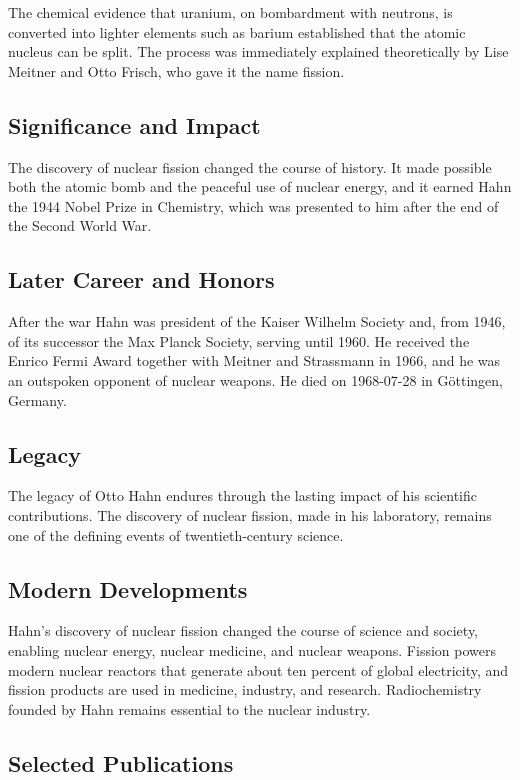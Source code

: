 The chemical evidence that uranium, on bombardment with neutrons, is converted into lighter elements such as barium established that the atomic nucleus can be split.
The process was immediately explained theoretically by Lise Meitner and Otto Frisch, who gave it the name fission.

\subsection*{Significance and Impact}

The discovery of nuclear fission changed the course of history.
It made possible both the atomic bomb and the peaceful use of nuclear energy, and it earned Hahn the 1944 Nobel Prize in Chemistry, which was presented to him after the end of the Second World War.

\subsection*{Later Career and Honors}

After the war Hahn was president of the Kaiser Wilhelm Society and, from 1946, of its successor the Max Planck Society, serving until 1960.
He received the Enrico Fermi Award together with Meitner and Strassmann in 1966, and he was an outspoken opponent of nuclear weapons.
He died on 1968-07-28 in Göttingen, Germany.

\subsection*{Legacy}

The legacy of Otto Hahn endures through the lasting impact of his scientific contributions.
The discovery of nuclear fission, made in his laboratory, remains one of the defining events of twentieth-century science.

\subsection*{Modern Developments}

Hahn's discovery of nuclear fission changed the course of science and society, enabling nuclear energy, nuclear medicine, and nuclear weapons. Fission powers modern nuclear reactors that generate about ten percent of global electricity, and fission products are used in medicine, industry, and research. Radiochemistry founded by Hahn remains essential to the nuclear industry.

\subsection*{Selected Publications}

